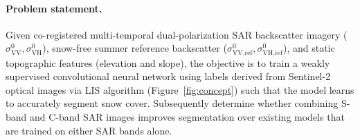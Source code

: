 \documentclass{article}
\begin{document}
\paragraph{Problem statement.}
Given co-registered multi-temporal dual-polarization SAR backscatter imagery ($\sigma^0_{\text{VV}}, \sigma^0_{\text{VH}}$), snow-free summer reference backscatter ($\sigma^0_{\text{VV,ref}}, \sigma^0_{\text{VH,ref}}$), and static topographic features (elevation and slope), the objective is to train a weakly supervised convolutional neural network using labels derived from Sentinel-2 optical images via LIS algorithm (Figure~\ref{fig:concept}) such that the model learns to accurately segment snow cover. Subsequently determine whether combining S-band and C-band SAR images improves segmentation over existing models that are trained on either SAR bands alone.
\end{document}

